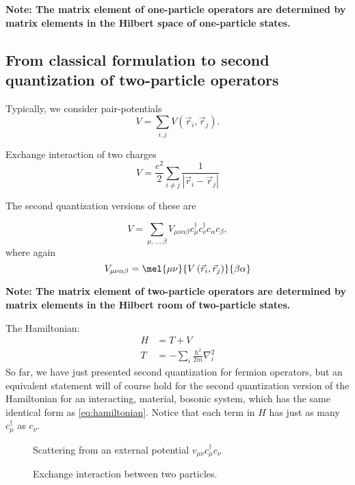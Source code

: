 \textbf{Note: The matrix element of one-particle operators are determined by matrix elements in the Hilbert space of one-particle states.}

\subsection{From classical formulation to second quantization of two-particle operators}

Typically, we consider pair-potentials 
\begin{equation}
V = \sum_{i, j} V\left(\vec{r}_i, \vec{r}_j\right).
\end{equation}

\begin{theorem}
Exchange interaction of two charges
\begin{equation}
V = \frac{e^2}{2}\sum_{i\ne j} \frac{1}{|\vec{r}_i - \vec{r}_j|}
\end{equation}
\end{theorem}

The second quantization versions of these are

\begin{equation}
V = \sum_{\mu, \dots, \beta} V_{\mu\nu\alpha\beta}c_{\mu}^\dagger c_{\nu}^\dagger c_{\alpha}c_{\beta},
\end{equation}
where again
\begin{equation}
V_{\mu\nu\alpha\beta} = \mel{\mu\nu}{V\left(\vec{r}_i, \vec{r}_j\right)}{\beta\alpha}
\end{equation}

\textbf{Note: The matrix element of two-particle operators are determined by matrix elements in the Hilbert room of two-particle states.}

The Hamiltonian:
\begin{align}
H &= T + V \label{eq:hamiltonian} \\
T &= -\sum_i \frac{\hbar^2}{2m}\nabla_i^2
\end{align}
So far, we have just presented second quantization for fermion operators, but an equivalent statement will of course hold for the second quantization version of the Hamiltonian for an interacting, material, bosonic system, which has the same identical form as \eqref{eq:hamiltonian}. Notice that each term in $H$ has just as many $c_\mu^\dagger$ as $c_{\nu}$.


\begin{figure}
\centering

\caption{Scattering from an external potential $v_{\mu\nu}c_{\mu}^\dagger c_{\nu}$}
\end{figure}


\begin{figure}
\centering

\caption{Exchange interaction between two particles.}
\end{figure}


